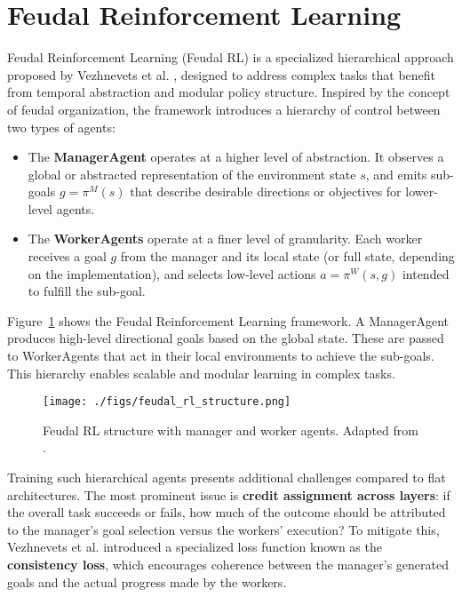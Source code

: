 \documentclass[12pt,a4paper,twoside,openany]{book}
\begin{document}
\section{Feudal Reinforcement Learning}

Feudal Reinforcement Learning (Feudal RL) is a specialized hierarchical approach proposed by Vezhnevets et al. \cite{Vezhnevets2017}, designed to address complex tasks that benefit from temporal abstraction and modular policy structure. Inspired by the concept of feudal organization, the framework introduces a hierarchy of control between two types of agents:

\begin{itemize}
    \item The \textbf{ManagerAgent} operates at a higher level of abstraction. It observes a global or abstracted representation of the environment state \(s\), and emits sub-goals \(g = \pi^M(s)\) that describe desirable directions or objectives for lower-level agents.
    \item The \textbf{WorkerAgents} operate at a finer level of granularity. Each worker receives a goal \(g\) from the manager and its local state (or full state, depending on the implementation), and selects low-level actions \(a = \pi^W(s, g)\) intended to fulfill the sub-goal.
\end{itemize}

Figure~\ref{fig:feudal_rl_structure} shows the Feudal Reinforcement Learning framework. A ManagerAgent produces high-level directional goals based on the global state. These are passed to WorkerAgents that act in their local environments to achieve the sub-goals. This hierarchy enables scalable and modular learning in complex tasks.

\begin{figure}[h]
\centering
\texttt{[image: ./figs/feudal\_rl\_structure.png]}
\captionsetup{font=small}
\caption{Feudal RL structure with manager and worker agents. Adapted from \cite{Vezhnevets2017}.}
\label{fig:feudal_rl_structure}
\end{figure}

Training such hierarchical agents presents additional challenges compared to flat architectures. The most prominent issue is \textbf{credit assignment across layers}: if the overall task succeeds or fails, how much of the outcome should be attributed to the manager's goal selection versus the workers’ execution? To mitigate this, Vezhnevets et al.\cite{Vezhnevets2017} introduced a specialized loss function known as the \textbf{consistency loss}, which encourages coherence between the manager's generated goals and the actual progress made by the workers.
\end{document}
